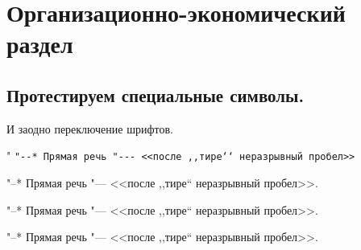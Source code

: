 \chapter{Организационно-экономический раздел}
\label{cha:econom}

\section{Протестируем специальные символы.}

И заодно переключение шрифтов.


{\shorthandoff" \texttt{"-{}-* Прямая речь "-{}-{}- <{}<после ,{},тире`{}` неразрывный пробел>{}>}}

{
"--* Прямая речь "--- <<после ,,тире`` неразрывный пробел>>.}

{
"--* Прямая речь "--- <<после ,,тире`` неразрывный пробел>>.}

{
"--* Прямая речь "--- <<после ,,тире`` неразрывный пробел>>.}


